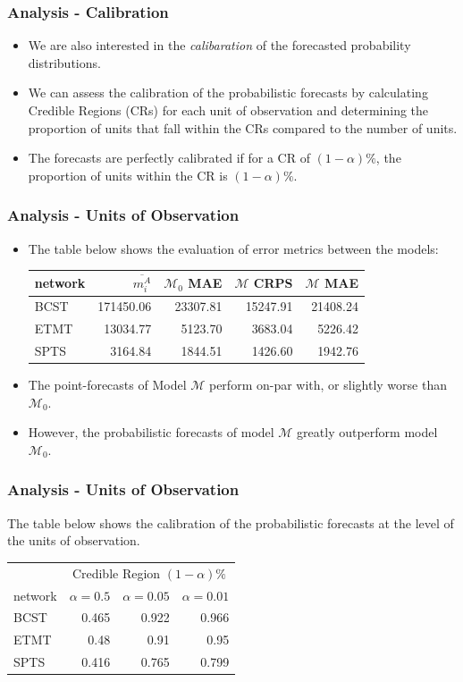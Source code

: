 \documentclass{beamer}
\begin{document}
\begin{frame}
\frametitle{Analysis - Calibration}
\begin{itemize}
  \item We are also interested in the \emph{calibaration} of the forecasted probability distributions.
    \pause
  \item We can assess the calibration of the probabilistic forecasts by calculating
    Credible Regions (CRs) for each unit of observation and determining the proportion of units
    that fall within the CRs compared to the number of units.
  \pause
    \item The forecasts are perfectly calibrated if for a CR of $(1 - \alpha)\%$, the proportion of units
    within the CR is $(1-\alpha)\%$.
\end{itemize}
\end{frame}

\begin{frame}
\frametitle{Analysis - Units of Observation}
\begin{itemize}
  \item The table below shows the evaluation of error metrics between the models:
    \begin{table}[h!]
      \centering
      \begin{tabular}{lrrrr}
        network & $\overline{m_i^A}$ & $\mathcal{M}_0$ MAE & $\mathcal{M}$ CRPS & $\mathcal{M}$ MAE \\
        \hline
        BCST & 171450.06 & 23307.81 & 15247.91 & 21408.24 \\
        ETMT & 13034.77 & 5123.70 & 3683.04 & 5226.42 \\
        SPTS & 3164.84 & 1844.51 & 1426.60 & 1942.76
      \end{tabular}
    \end{table}
  \item The point-forecasts of Model $\mathcal{M}$ perform on-par with, or slightly worse than $\mathcal{M}_0$.
  \pause
  \item However, the probabilistic forecasts of model $\mathcal{M}$ greatly outperform model $\mathcal{M}_0$.
\end{itemize}

\end{frame}

\begin{frame}
\frametitle{Analysis - Units of Observation}
The table below shows the calibration of the probabilistic forecasts at the level
of the units of observation.
\begin{table}[h!]
  \centering
  \begin{tabular}{lrrr}
    & \multicolumn{3}{c}{Credible Region $(1 - \alpha)\%$} \\
    network & $\alpha = 0.5$ & $\alpha = 0.05$ & $\alpha = 0.01$ \\
    \hline
    BCST & 0.465 & 0.922 & 0.966 \\
    ETMT & 0.48 & 0.91 & 0.95  \\
    SPTS & 0.416 & 0.765 & 0.799 \\
  \end{tabular}
\end{table}
\end{frame}
\end{document}
